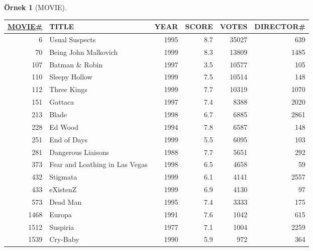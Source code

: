 \documentclass[dvipsnames]{beamer}
\theoremstyle{definition}
\theoremstyle{example}
\newtheorem{ornek}[theorem]{Örnek}
\theoremstyle{plain}
\begin{document}
\begin{frame}
  \begin{ornek}[MOVIE]
    \begin{tiny}
    \begin{table}
      \begin{tabular}{|r|l|r|r|r|r|}\hline
\underline{MOVIE\#} & TITLE           & YEAR & SCORE & VOTES & DIRECTOR\#\\[2pt]\hline\hline
   6 & Usual Suspects                 & 1995 &   8.7 & 35027 &        639\\\hline
  70 & Being John Malkovich           & 1999 &   8.3 & 13809 &       1485\\\hline
 107 & Batman \& Robin                & 1997 &   3.5 & 10577 &        105\\\hline
 110 & Sleepy Hollow                  & 1999 &   7.5 & 10514 &        148\\\hline
 112 & Three Kings                    & 1999 &   7.7 & 10319 &       1070\\\hline
 151 & Gattaca                        & 1997 &   7.4 &  8388 &       2020\\\hline
 213 & Blade                          & 1998 &   6.7 &  6885 &       2861\\\hline
 228 & Ed Wood                        & 1994 &   7.8 &  6587 &        148\\\hline
 251 & End of Days                    & 1999 &   5.5 &  6095 &        103\\\hline
 281 & Dangerous Liaisons             & 1988 &   7.7 &  5651 &        292\\\hline
 373 & Fear and Loathing in Las Vegas & 1998 &   6.5 &  4658 &         59\\\hline
 432 & Stigmata                       & 1999 &   6.1 &  4141 &       2557\\\hline
 433 & eXistenZ                       & 1999 &   6.9 &  4130 &         97\\\hline
 573 & Dead Man                       & 1995 &   7.4 &  3333 &        175\\\hline
1468 & Europa                         & 1991 &   7.6 &  1042 &        615\\\hline
1512 & Suspiria                       & 1977 &   7.1 &  1004 &       2259\\\hline
1539 & Cry-Baby                       & 1990 &   5.9 &   972 &        364\\\hline
    \end{tabular}
  \end{table}
  \end{tiny}
  \end{ornek}
\end{frame}
\end{document}
